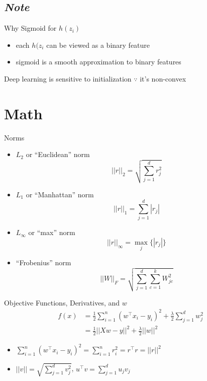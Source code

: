 \documentclass[10pt,landscape,a4paper]{article}
\begin{document}
\begin{multicols*}{5}
\subsection{\emph{Note}}
Why Sigmoid for \(h(z_i)\)
\begin{itemize}
    \item each \(h(z_i\) can be viewed as a binary feature
    \item sigmoid is a smooth approximation to binary features
\end{itemize}
Deep learning is sensitive to initialization \(\because\) it's non-convex

\section{Math}
Norms
\begin{itemize}
    \item \(L_2\) or ``Euclidean'' norm
    \begin{equation*}
         ||r||_2 = \sqrt{\sum_{j=1}^{d} r_j^2}
    \end{equation*}
    \item \(L_1\) or ``Manhattan'' norm
    \begin{equation*}
        ||r||_1 = \sum_{j=1}^{d} |r_j|
    \end{equation*}
    \item \(L_{\infty}\) or ``max'' norm
    \begin{equation*}
        ||r||_{\infty} = \max_j{\{|r_j|}\}
    \end{equation*}
    \item ``Frobenius'' norm
    \begin{equation*}
        ||W||_F = \sqrt{\sum_{j=1}^{d} \sum_{c=1}^{k} W_{jc}^2}
    \end{equation*}
\end{itemize}
Objective Functions, Derivatives, and \(w\)
\begin{align*}
   f(x) &= \frac{1}{2}\sum\limits_{i=1}^{n} (w^\intercal x_i - y_i)^2 + \frac{\lambda}{2} \sum\limits_{j=1}^{d} w_j^2 \\
   &= \frac{1}{2} ||Xw-y||^2 + \frac{\lambda}{2} ||w||^2
\end{align*}
\begin{itemize}
    \item \(\sum\limits_{i=1}^{n} (w^\intercal x_i - y_i)^2 = \sum\limits_{i=1}^{n} r_i^2 = r^\intercal r = ||r||^2\)
    \item \(||v|| = \sqrt{\sum\limits_{j=1}^{d} v_j^2}\), \(u^\intercal v = \sum\limits_{j=1}^{d} u_j v_j\)

\end{itemize}
\end{multicols*}
\end{document}
